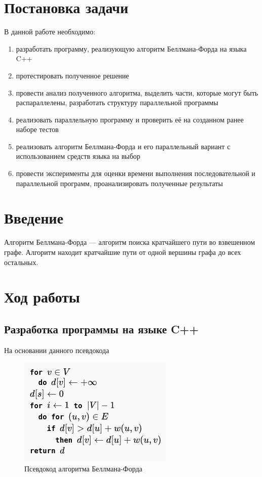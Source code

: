 \documentclass[utf8x, 14pt]{article}
\begin{document}
\section{Постановка задачи}
В данной работе необходимо:
\begin{enumerate}
	\item разработать программу, реализующую алгоритм Беллмана-Форда на языка C++
	\item протестировать полученное решение
	\item провести анализ полученного алгоритма, выделить части, которые могут быть распараллелены, разработать структуру параллельной программы
	\item реализовать параллельную программу и проверить её на созданном ранее наборе тестов
	\item реализовать алгоритм Беллмана-Форда и его параллельный вариант с использованием средств языка на выбор
	\item провести эксперименты для оценки времени выполнения последовательной и параллельной программ, проанализировать полученные результаты
\end{enumerate}

\section{Введение}
Алгоритм Беллмана-Форда — алгоритм поиска кратчайшего пути во взвешенном графе. Алгоритм находит кратчайшие пути от одной вершины графа до всех остальных. 

\section{Ход работы}
\subsection{Разработка программы на языке C++}

На основании данного псевдокода

\begin{figure}[h!]
	\centering
	\includegraphics[scale=0.75]{Bellman-Ford.png}
	\caption{Псевдокод алгоритма Беллмана-Форда}
\end{figure}
\end{document}
